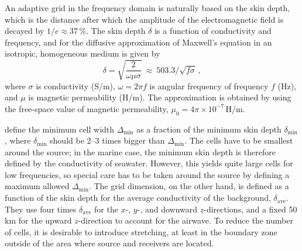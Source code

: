 \documentclass[
    manuscript,
    revised,
  ]{geophysics}
\begin{document}
An adaptive grid in the frequency domain is naturally based on the skin depth,
which is the distance after which the amplitude of the electromagnetic field is
decayed by $1/e\approx 37\,\%$. The skin depth $\delta$ is a function of
conductivity and frequency, and for the diffusive approximation of Maxwell's
equation in an isotropic, homogeneous medium is given by \citep[e.g.,][
equation~1.53]{B.SEG.88.Ward}
%
\begin{equation}
  \delta = \sqrt{\frac{2}{\omega\mu\sigma}}
  \ \approx \
  503.3/\sqrt{f\sigma} \, ,
  \label{eq:skindepth}
\end{equation}
%
where $\sigma$ is conductivity (S/m), $\omega=2\pi f$ is angular frequency of
frequency $f$ (Hz), and $\mu$ is magnetic permeability (H/m). The approximation
is obtained by using the free-space value of magnetic permeability,
$\mu_0=4\pi\times10^{-7}\,$H/m.

\cite{GEO.07.Plessix} define the minimum cell width $\Delta_\mathrm{min}$ as a
fraction of the minimum skin depth $\delta_\mathrm{min}$, where
$\delta_\mathrm{min}$ should be 2--3 times bigger than $\Delta_\mathrm{min}$.
The cells have to be smallest around the source; in the marine case, the
minimum skin depth is therefore defined by the conductivity of seawater.
However, this yields quite large cells for low frequencies, so special care has
to be taken around the source by defining a maximum allowed
$\Delta_\mathrm{min}$. The grid dimension, on the other hand, is defined as a
function of the skin depth for the average conductivity of the background,
$\delta_\mathrm{ave}$. They use four times $\delta_\mathrm{ave}$ for the $x$-,
$y$-, and downward $z$-directions, and a fixed 50\,km for the upward
$z$-direction to account for the airwave. To reduce the number of cells, it is
desirable to introduce stretching, at least in the boundary zone outside of the
area where source and receivers are located.
\end{document}

